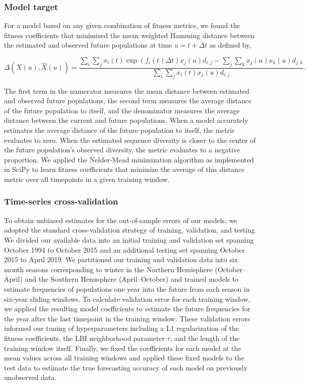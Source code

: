\subsubsection*{Model target}

For a model based on any given combination of fitness metrics, we found the fitness coefficients that minimized the mean weighted Hamming distance between the estimated and observed future populations at time $u = t + \Delta{t}$ as defined by,

$$
\Delta(X(u), \hat{X}(u)) = \frac{\sum_{i}\sum_{j}x_{i}(t)\exp(f_{i}(t)\Delta{t})x_{j}(u)d_{i,j} - \sum_{j}\sum_{k}x_{j}(u)x_{k}(u)d_{j,k}}{\sum_{i}\sum_{j}x_{i}(t)x_{j}(u)d_{i,j}}.
$$

The first term in the numerator measures the mean distance between estimated and observed future populations, the second term measures the average distance of the future population to itself, and the denominator measures the average distance between the current and future populations.
When a model accurately estimates the average distance of the future population to itself, the metric evaluates to zero.
When the estimated sequence diversity is closer to the center of the future population's observed diversity, the metric evaluates to a negative proportion.
We applied the Nelder-Mead minimization algorithm as implemented in SciPy \cite{SciPy} to learn fitness coefficients that minimize the average of this distance metric over all timepoints in a given training window.

\subsubsection*{Time-series cross-validation}

To obtain unbiased estimates for the out-of-sample errors of our models, we adopted the standard cross-validation strategy of training, validation, and testing.
We divided our available data into an initial training and validation set spanning October 1994 to October 2015 and an additional testing set spanning October 2015 to April 2019.
We partitioned our training and validation data into six month seasons corresponding to winter in the Northern Hemisphere (October--April) and the Southern Hemisphere (April--October) and trained models to estimate frequencies of populations one year into the future from each season in six-year sliding windows.
To calculate validation error for each training window, we applied the resulting model coefficients to estimate the future frequencies for the year after the last timepoint in the training window.
These validation errors informed our tuning of hyperparameters including a L1 regularization of the fitness coefficients, the LBI neighborhood parameter $\tau$, and the length of the training window itself.
Finally, we fixed the coefficients for each model at the mean values across all training windows and applied these fixed models to the test data to estimate the true forecasting accuracy of each model on previously unobserved data.

